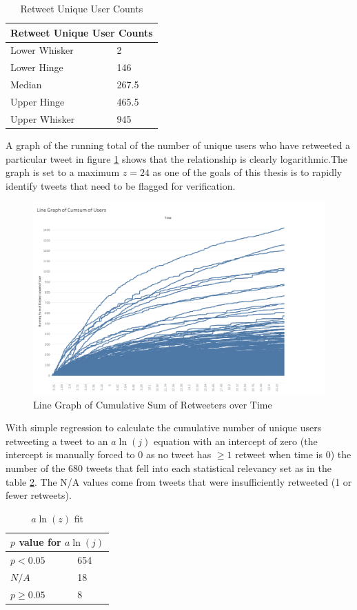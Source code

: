 \documentclass[NETN,manuscript]{stjour-new}
\begin{document}
\begin{table}[h]
\centering
\begin{tabular}{ |p{3cm}|p{3cm}|  }
\hline
\multicolumn{2}{|c|}{Retweet Unique User Counts} \\
\hline
Lower Whisker & 2\\
Lower Hinge & 146 \\
Median & 267.5 \\
Upper Hinge & 465.5 \\
Upper Whisker & 945 \\
\hline
\end{tabular}
\caption{Retweet Unique User Counts}
\label{Retweet Unique User Counts}
\end{table}

 
A graph of the running total of the number of unique users who have retweeted a particular tweet in figure \ref{fig:Users CumSum/Time} shows that the relationship is clearly logarithmic.The graph is set to a maximum $z = 24$ as one of the goals of this thesis is to rapidly identify tweets that need to be flagged for verification.
\begin{figure}[h!]
 \centering
  \includegraphics[width=12cm]{Linegraph cumsum users.png}
  \caption{Line Graph of Cumulative Sum of Retweeters over Time}\label{fig:Users CumSum/Time}
 \end{figure}

With simple regression to calculate the cumulative number of unique users retweeting a tweet to an $a\ln(j)$ equation with an intercept of zero (the intercept is manually forced to 0 as no tweet has $\geq 1$ retweet when time is 0) the number of the 680 tweets that fell into each statistical relevancy set as in the table \ref{Natural Log Fit}. The N/A values come from tweets that were insufficiently retweeted (1 or fewer retweets).   
\begin{table}[h!]
\centering
\begin{tabular}{ |p{3cm}|p{3cm}|  }
\hline
\multicolumn{2}{|c|}{$p$ value for $a\ln(j)$} \\
\hline
$p < 0.05$  & 654\\
$N/A$ & 18 \\
$ p \geq 0.05$ & 8 \\
\hline
\end{tabular}
\caption{$a\ln(z)$ fit}
\label{Natural Log Fit}
\end{table}
\end{document}
